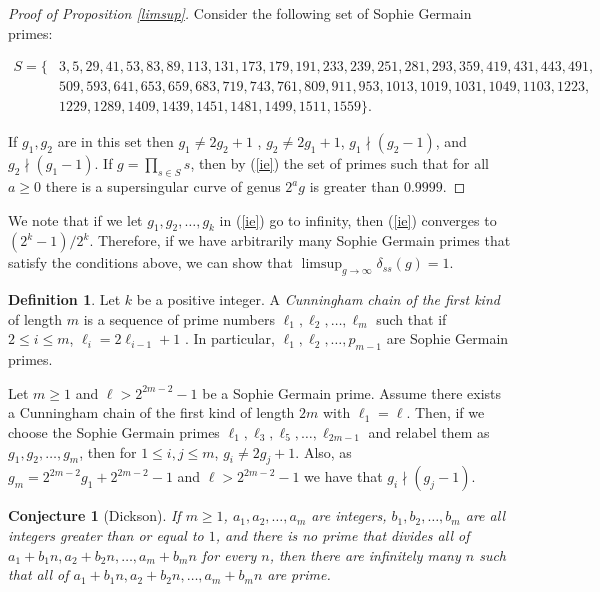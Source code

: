 \documentclass{article}
\newtheorem{conjecture}[theorem]{Conjecture}
\theoremstyle{remark}
\theoremstyle{definition}
\newtheorem{definition}[theorem]{Definition}
\begin{document}
\begin{proof}[Proof of Proposition \ref{limsup}]
    Consider the following set of Sophie Germain primes: 
    
    \begin{align*} S = \{&3, 5, 29, 41, 53, 83, 89, 113, 131, 173, 179, 191, 233, 239, 251, 281, 293, 359, 419, 431, 443, 491,\\ &509, 593, 641, 653, 659, 683, 719, 743, 761, 809, 911, 953, 1013, 1019, 1031, 1049, 1103, 1223,\\ &1229, 1289, 1409, 1439, 1451, 1481, 1499, 1511, 1559\}. \end{align*}
    
    If $g_1,g_2$ are in this set then $g_1 \neq 2g_2+1$ , $g_2 \neq 2g_1+1$, $g_1 \nmid (g_2-1)$, and $g_2 \nmid (g_1-1)$. If $g = \prod_{s \in S} s$, then by (\ref{ie}) the set of primes such that for all $a \geq 0$ there is a supersingular curve of genus $2^ag$ is greater than $0.9999$.
\end{proof}

We note that if we let $g_1,g_2,\ldots,g_k$ in (\ref{ie}) go to infinity, then (\ref{ie}) converges to $(2^k-1)/2^k$. Therefore, if we have arbitrarily many Sophie Germain primes that satisfy the conditions above, we can show that $\limsup_{g \to \infty} \delta_{ss}(g) = 1$.

\begin{definition}
    Let $k$ be a positive integer. A \textit{Cunningham chain of the first kind} of length $m$ is a sequence of prime numbers $\ell_1,\ell_2,\ldots,\ell_m$ such that if $2 \leq i \leq m$, $\ell_i = 2\ell_{i-1}+1$ \cite[Section 3.6]{caldwell}. In particular, $\ell_1,\ell_2,\ldots,p_{m-1}$ are Sophie Germain primes. 
\end{definition}
Let $m \geq 1$ and $\ell > 2^{2m-2}-1$ be a Sophie Germain prime. Assume there exists a Cunningham chain of the first kind of length $2m$ with $\ell_1 = \ell$. Then, if we choose the Sophie Germain primes $\ell_1, \ell_3, \ell_5, \ldots, \ell_{2m-1}$ and relabel them as $g_1,g_2, \ldots, g_m$, then for $1 \leq i,j \leq m$, $g_i \neq 2g_j+1$. Also, as $g_m = 2^{2m-2}g_1+2^{2m-2}-1$ and $\ell > 2^{2m-2}-1$ we have that $g_i \nmid (g_j-1)$.

\begin{conjecture}[Dickson] \label{conjecture:dickson}
    \cite[Conjecture 1.3]{caldwell} If $m \geq 1$, $a_1,a_2,\ldots,a_m$ are integers, $b_1,b_2,\ldots,b_m$ are all integers greater than or equal to $1$, and there is no prime that divides all of $a_1+b_1n, a_2+b_2n,\ldots, a_m+b_mn$ for every $n$, then there are infinitely many $n$ such that all of $a_1+b_1n, a_2+b_2n,\ldots, a_m+b_mn$ are prime.
\end{conjecture}
\end{document}
